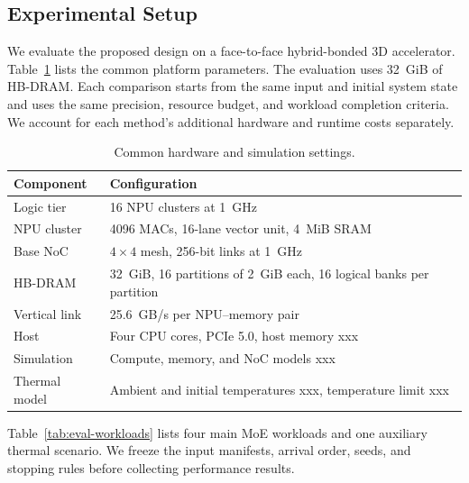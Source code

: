 \documentclass[conference,10pt]{IEEEtran}
\begin{document}
\subsection{Experimental Setup}

We evaluate the proposed design on a face-to-face hybrid-bonded 3D accelerator. Table~\ref{tab:eval-platform} lists the common platform parameters. The evaluation uses 32~GiB of HB-DRAM. Each comparison starts from the same input and initial system state and uses the same precision, resource budget, and workload completion criteria. We account for each method's additional hardware and runtime costs separately.

\begin{table}[t]
\caption{Common hardware and simulation settings.}
\label{tab:eval-platform}
\centering\small
\begin{tabular}{@{}lp{}@{}}
\hline
Component & Configuration \\
\hline
Logic tier & 16 NPU clusters at 1~GHz \\
NPU cluster & 4096 MACs, 16-lane vector unit, 4~MiB SRAM \\
Base NoC & $4\times4$ mesh, 256-bit links at 1~GHz \\
HB-DRAM & 32~GiB, 16 partitions of 2~GiB each, 16 logical banks per partition \\
Vertical link & 25.6~GB/s per NPU--memory pair \\
Host & Four CPU cores, PCIe 5.0, host memory xxx \\
Simulation & Compute, memory, and NoC models xxx \\
Thermal model & Ambient and initial temperatures xxx, temperature limit xxx \\
\hline
\end{tabular}
\end{table}

Table~\ref{tab:eval-workloads} lists four main MoE workloads and one auxiliary thermal scenario. We freeze the input manifests, arrival order, seeds, and stopping rules before collecting performance results.
\end{document}

